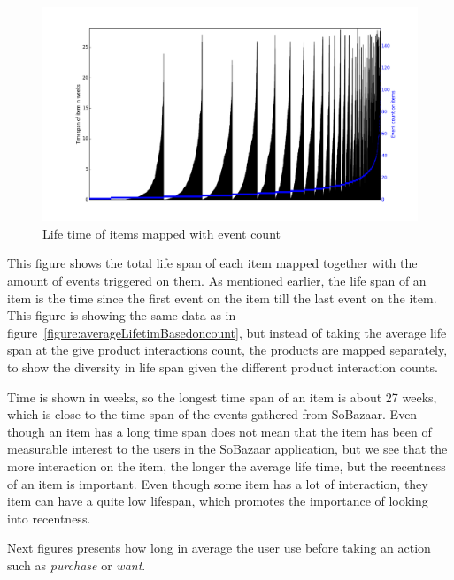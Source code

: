 \begin{figure}[H]
  \centering
  \includegraphics[width=5in]{image/itemTimeSpansortedoneventcount.png}
  \caption{Life time of items mapped with event count}
  \label{figure:itemTimeSpanEventCount}
\end{figure}

This figure shows the total life span of each item mapped together with the
amount of events triggered on them.  As mentioned earlier, the life span of an
item is the time since the first event on the item till the last event on the
item.  This figure is showing the same data as in
figure~\ref{figure:averageLifetimBasedoncount}, but instead of taking the
average life span at the give product interactions count, the products are
mapped separately, to show the diversity in life span given the different
product interaction counts.

Time is shown in weeks, so the longest time span of an item is about 27 weeks,
which is close to the time span of the events gathered from SoBazaar.  Even
though an item has a long time span does not mean that the item has been of
measurable interest to the users in the SoBazaar application, but we see that
the more interaction on the item, the longer the average life time, but the
recentness of an item is important.  Even though some item has a lot of
interaction, they item can have a quite low lifespan, which promotes the
importance of looking into recentness.

Next figures presents how long in average the user use before taking an action
such as \emph{purchase} or \emph{want}.

